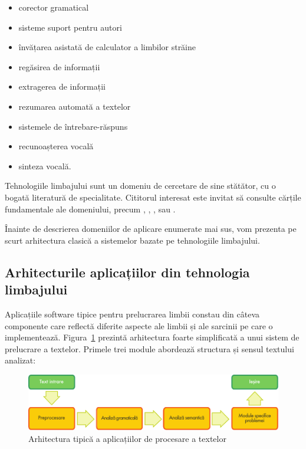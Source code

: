 \begin{multicols}{2}
\begin{itemize}
\item corector gramatical
\item sisteme suport pentru autori
\item învățarea asistată de calculator a limbilor străine
\item regăsirea de informații
\item extragerea de informații
\item rezumarea automată a textelor
\item sistemele de întrebare-răspuns
\item recunoașterea vocală
\item sinteza vocală.
\end{itemize}

Tehnologiile limbajului sunt un domeniu de cercetare de sine stătător, cu o bogată literatură de specialitate. Cititorul interesat este invitat să consulte cărțile fundamentale ale domeniului, precum \cite{carstensen-etal1}, \cite{jurafsky-martin01}, \cite{manning-schuetze1}, \cite{lt-world1} sau \cite{lt-survey1}.

Înainte de descrierea domeniilor de aplicare enumerate mai sus, vom prezenta pe scurt arhitectura clasică a sistemelor bazate pe tehnologiile limbajului.

\subsection{Arhitecturile aplicațiilor din tehnologia limbajului}

Aplicațiile software tipice pentru prelucrarea limbii constau din câteva componente care reflectă diferite aspecte ale limbii și ale sarcinii pe care o implementează. Figura~\ref{fig:textprocessingarch_de} prezintă arhitectura foarte simplificată a unui sistem de prelucrare a textelor. Primele trei module abordează structura și sensul textului analizat:

\begin{figure}[b]
\center
\includegraphics[width=\textwidth]{../_media/romanian/text_processing_app_architecture}
\caption{Arhitectura tipică a aplicațiilor de procesare a textelor}
\label{fig:textprocessingarch_de}
\end{figure}


\end{multicols}
